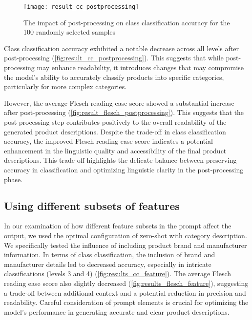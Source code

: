 \begin{figure}[H]
	\centering
	\texttt{[image: result\_cc\_postprocessing]}
	\caption{The impact of post-processing on class classification accuracy for the 100 randomly selected samples}
	\label{fig:result_cc_postprocessing}
\end{figure}

Class classification accuracy exhibited a notable decrease across all levels after post-processing (\autoref{fig:result_cc_postprocessing}). This suggests that while post-processing may enhance readability, it introduces changes that may compromise the model's ability to accurately classify products into specific categories, particularly for more complex categories.

However, the average Flesch reading ease score showed a substantial increase after post-processing (\autoref{fig:result_flesch_postprocessing}). This suggests that the post-processing step contributes positively to the overall readability of the generated product descriptions. Despite the trade-off in class classification accuracy, the improved Flesch reading ease score indicates a potential enhancement in the linguistic quality and accessibility of the final product descriptions. This trade-off highlights the delicate balance between preserving accuracy in classification and optimizing linguistic clarity in the post-processing phase.

\subsection{Using different subsets of features}\label{feature-subsets}

In our examination of how different feature subsets in the prompt affect the output, we used the optimal configuration of zero-shot with category description. We specifically tested the influence of including product brand and manufacturer information. In terms of class classification, the inclusion of brand and manufacturer details led to decreased accuracy, especially in intricate classifications (levels 3 and 4) (\autoref{fig:results_cc_feature}). The average Flesch reading ease score also slightly decreased (\autoref{fig:results_flesch_feature}), suggesting a trade-off between additional context and a potential reduction in precision and readability. Careful consideration of prompt elements is crucial for optimizing the model's performance in generating accurate and clear product descriptions.



